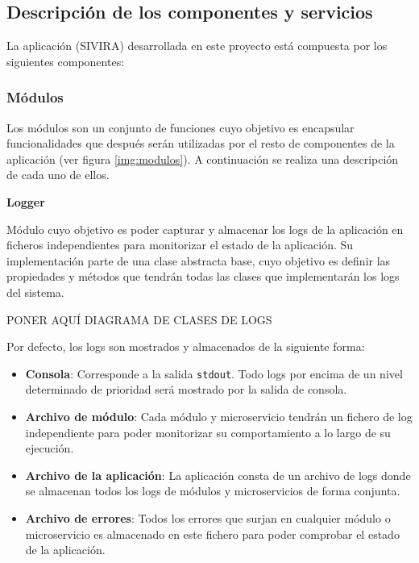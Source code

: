 


\pagestyle{miEstilo502}


\subsection{Descripción de los componentes y servicios}

La aplicación (SIVIRA) desarrollada en este proyecto está compuesta por los siguientes componentes:

\subsubsection{Módulos}

Los módulos son un conjunto de funciones cuyo objetivo es encapsular funcionalidades que después serán utilizadas por el resto de componentes de la aplicación (ver figura \ref{img:modulos}). A continuación se realiza una descripción de cada uno de ellos.

\textbf{Logger}

Módulo cuyo objetivo es poder capturar y almacenar los logs de la aplicación en ficheros independientes para monitorizar el estado de la aplicación. Su implementación parte de una clase abstracta base, cuyo objetivo es definir las propiedades y métodos que tendrán todas las clases que implementarán los logs del sistema. 


PONER AQUÍ DIAGRAMA DE CLASES DE LOGS

\newpage

Por defecto, los logs son mostrados y almacenados de la siguiente forma:

\begin{itemize}
\item \textbf{Consola}: Corresponde a la salida \texttt{stdout}. Todo logs por encima de un nivel determinado de prioridad será mostrado por la salida de consola.

\item \textbf{Archivo de módulo}: Cada módulo y microservicio tendrán un fichero de log independiente para poder monitorizar su comportamiento a lo largo de su ejecución.

\item \textbf{Archivo de la aplicación}: La aplicación consta de un archivo de logs donde se almacenan todos los logs de módulos y microservicios de forma conjunta.

\item \textbf{Archivo de errores}: Todos los errores que surjan en cualquier módulo o microservicio es almacenado en este fichero para poder comprobar el estado de la aplicación.

\end{itemize}

